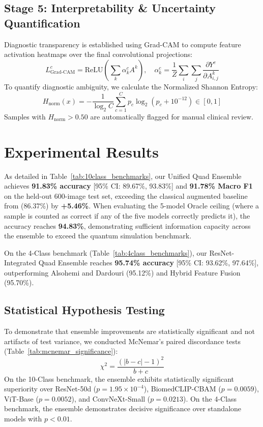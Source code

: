 \documentclass[journal]{IEEEtran}
\begin{document}
\subsection{Stage 5: Interpretability \& Uncertainty Quantification}
Diagnostic transparency is established using Grad-CAM \cite{selvaraju2017grad} to compute feature activation heatmaps over the final convolutional projections:
\begin{equation}
    L_{\text{Grad-CAM}}^c = \text{ReLU}\left(\sum_k \alpha_k^c A^k\right), \quad \alpha_k^c = \frac{1}{Z}\sum_i \sum_j \frac{\partial Y^c}{\partial A_{i,j}^k}
\end{equation}
To quantify diagnostic ambiguity, we calculate the Normalized Shannon Entropy:
\begin{equation}
    H_{\text{norm}}(x) = -\frac{1}{\log_2 C} \sum_{c=1}^C p_c \log_2(p_c + 10^{-12}) \in [0, 1]
\end{equation}
Samples with $H_{\text{norm}} > 0.50$ are automatically flagged for manual clinical review.

\section{Experimental Results}





As detailed in Table~\ref{tab:10class_benchmarks}, our Unified Quad Ensemble achieves \textbf{91.83\% accuracy} [95\% CI: 89.67\%, 93.83\%] and \textbf{91.78\% Macro F1} on the held-out 600-image test set, exceeding the classical augmented baseline from \cite{srivastava2026} (86.37\%) by \textbf{+5.46\%}. When evaluating the 5-model Oracle ceiling (where a sample is counted as correct if any of the five models correctly predicts it), the accuracy reaches \textbf{94.83\%}, demonstrating sufficient information capacity across the ensemble to exceed the quantum simulation benchmark.

On the 4-Class benchmark (Table~\ref{tab:4class_benchmarks}), our ResNet-Integrated Quad Ensemble reaches \textbf{95.74\% accuracy} [95\% CI: 93.62\%, 97.64\%], outperforming Alsohemi and Dardouri \cite{alsohemi2025} (95.12\%) and Hybrid Feature Fusion (95.70\%).

\subsection{Statistical Hypothesis Testing}
To demonstrate that ensemble improvements are statistically significant and not artifacts of test variance, we conducted McNemar's paired discordance tests (Table~\ref{tab:mcnemar_significance}):
\begin{equation}
    \chi^2 = \frac{(|b - c| - 1)^2}{b + c}
\end{equation}
On the 10-Class benchmark, the ensemble exhibits statistically significant superiority over ResNet-50d ($p = 1.95\times 10^{-4}$), BiomedCLIP-CBAM ($p = 0.0059$), ViT-Base ($p = 0.0052$), and ConvNeXt-Small ($p = 0.0213$). On the 4-Class benchmark, the ensemble demonstrates decisive significance over standalone models with $p < 0.01$.
\end{document}
